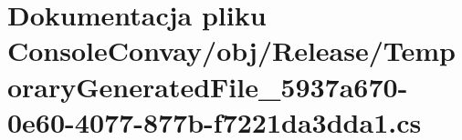 \hypertarget{_console_convay_2obj_2_release_2_temporary_generated_file__5937a670-0e60-4077-877b-f7221da3dda1_8cs}{}\section{Dokumentacja pliku Console\+Convay/obj/\+Release/\+Temporary\+Generated\+File\+\_\+5937a670-\/0e60-\/4077-\/877b-\/f7221da3dda1.cs}
\label{_console_convay_2obj_2_release_2_temporary_generated_file__5937a670-0e60-4077-877b-f7221da3dda1_8cs}
